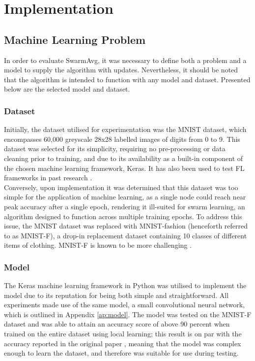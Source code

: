 \chapter{Implementation}
\section{Machine Learning Problem}
In order to evaluate SwarmAvg, it was necessary to define both a problem and a model to supply the algorithm with updates. Nevertheless, it should be noted that the algorithm is intended to function with any model and dataset. Presented below are the selected model and dataset.

\subsection{Dataset}
Initially, the dataset utilised for experimentation was the MNIST dataset, which encompasses 60,000 greyscale 28x28 labelled images of digits from 0 to 9. This dataset was selected for its simplicity, requiring no pre-processing or data cleaning prior to training, and due to its availability as a built-in component of the chosen machine learning framework, Keras. It has also been used to test FL frameworks in past research \cite{leaderelec_car}. \\

Conversely, upon implementation it was determined that this dataset was too simple for the application of machine learning, as a single node could reach near peak accuracy after a single epoch, rendering it ill-suited for swarm learning, an algorithm designed to function across multiple training epochs.  To address this issue, the MNIST dataset was replaced with MNIST-fashion (henceforth referred to as MNIST-F), a drop-in replacement dataset containing 10 classes of different items of clothing. MNIST-F is known to be more challenging \cite{xiao2017fashionmnist}.

\subsection{Model}
The Keras machine learning framework in Python was utilised to implement the model due to its reputation for being both simple and straightforward. All experiments made use of the same model, a small convolutional neural network, which is outlined in Appendix \ref{ap:model}. The model was tested on the MNIST-F dataset and was able to attain an accuracy score of above 90 percent when trained on the entire dataset using local learning; this result is on par with the accuracy reported in the original paper \cite{xiao2017fashionmnist}, meaning that the model was complex enough to learn the dataset, and therefore was suitable for use during testing.


